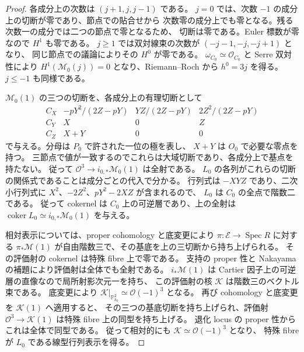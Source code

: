 \begin{proof}
各成分上の次数は $(j+1,j,j-1)$ である。
$j=0$ では、次数 $-1$ の成分上の切断が零であり、節点での貼合せから
次数零の成分上でも零となる。残る次数一の成分では二つの節点で零となるため、
切断は零である。Euler 標数が零なので $H^1$ も零である。
$j\ge1$ では双対線束の次数が $(-j-1,-j,-j+1)$ となり、
同じ節点での議論によりその $H^0$ が零である。
$\omega_{C_0}\simeq\mathcal O_{C_0}$ と Serre 双対性により
$H^1(\mathcal M_0(j))=0$ となり、Riemann--Roch から $h^0=3j$ を得る。
$j\le-1$ も同様である。

$\mathcal M_0(1)$ の三つの切断を、各成分上の有理切断として
\[
 \begin{array}{c|ccc}
 C_X&-pY^2/(2Z-pY)&YZ/(2Z-pY)&2Z^2/(2Z-pY)\\
 C_Y&X&0&Z\\
 C_Z&X+Y&0&0
 \end{array}
\]
で与える。分母は $P_0$ で許された一位の極を表し、
$X+Y$ は $O_0$ で必要な零点を持つ。
三節点で値が一致するのでこれらは大域切断であり、各成分上で基点を持たない。
従って $\mathcal O^3\to i_{0,*}\mathcal M_0(1)$ は全射である。
$L_0$ の各列がこれらの切断の関係式であることは成分ごとの代入で分かる。
行列式は $-XYZ$ であり、二次小行列式に $X^2$、$-2Z^2$、$pY^2-2XZ$ が含まれるので、
$L_0$ は $C_0$ の全点で階数二である。
従って cokernel は $C_0$ 上の可逆層であり、上の全射は
$\operatorname{coker}L_0\simeq i_{0,*}\mathcal M_0(1)$ を与える。

相対表示については、proper cohomology と底変更により
$\pi:\mathcal E\to\operatorname{Spec}R$ に対する
$\pi_*\mathcal M(1)$ が自由階数三で、その基底を上の三切断から持ち上げられる。
その評価射の cokernel は特殊 fibre 上で零である。
支持の proper 性と Nakayama の補題により評価射は全体でも全射である。
$i_*\mathcal M(1)$ は Cartier 因子上の可逆層の直像なので局所射影次元一を持ち、
この評価射の核 $\mathcal K$ は階数三のベクトル束である。
底変更により $\mathcal K|_{\mathbb P^2_{k_0}}\simeq\mathcal O(-1)^3$ となる。
再び cohomology と底変更を $\mathcal K(1)$ へ適用すると、
その三つの基底切断を持ち上げられ、評価射
$\mathcal O^3\to\mathcal K(1)$ は特殊 fibre 上の同型を持ち上げる。
退化 locus の proper 性からこれは全体で同型である。
従って相対的にも $\mathcal K\simeq\mathcal O(-1)^3$ となり、
特殊 fibre が $L_0$ である線型行列表示を得る。
\end{proof}

